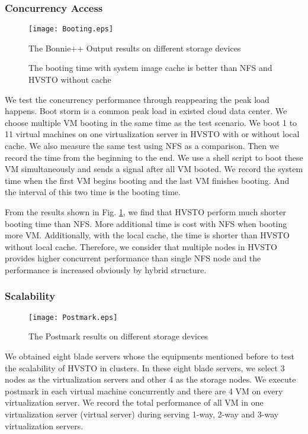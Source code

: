\documentclass[conference]{IEEEtran}
\begin{document}
\subsubsection{Concurrency Access}
\begin{figure}[!h]
\centering
\texttt{[image: Booting.eps]}
\caption{The Bonnie++ Output results on different storage devices}
\caption{The booting time with system image cache is better than NFS and HVSTO without cache}
\label{figure:booting}
\end{figure}
We test the concurrency performance through reappearing the peak load happens. Boot storm \cite{Soundararajan2010} is a common peak load in existed cloud data center. We choose multiple VM booting in the same time as the test scenario. We boot 1 to 11 virtual machines on one virtualization server in HVSTO with or without local cache. We also measure the same test using NFS as a comparison. Then we record the time from the beginning to the end. We use a shell script to boot these VM simultaneously and sends a signal after all VM booted. We record the system time when the first VM begins booting and the last VM finishes booting. And the interval of this two time is the booting time.

From the results shown in Fig. \ref{figure:booting}, we find that HVSTO perform much shorter booting time than NFS. More additional time is cost with NFS when booting more VM. Additionally, with the local cache, the time is shorter than HVSTO without local cache. Therefore, we consider that multiple nodes in HVSTO provides higher concurrent performance than single NFS node and the performance is increased obviously by hybrid structure.


\subsubsection{Scalability}

\begin{figure}[!h]
\centering
\texttt{[image: Postmark.eps]}
\caption{The Postmark results on different storage devices}
\label{figure:postmark}
\end{figure}
We obtained eight blade servers whose the equipments mentioned before to test the scalability of HVSTO in clusters. In these eight blade servers, we select 3 nodes as the virtualization servers and other 4 as the storage nodes. We execute postmark \cite{Katcher1997} in each virtual machine concurrently and there are 4 VM on every virtualization server. We record the total performance of all VM in one virtualization server (virtual server) during serving 1-way, 2-way and 3-way virtualization servers. 
\end{document}
